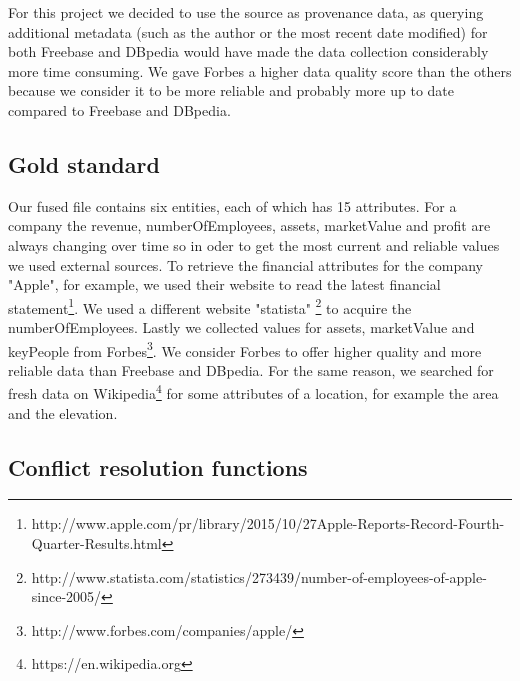 

For this project we decided to use the source as provenance data, as querying additional metadata (such as the author or the most recent date modified) for both Freebase and DBpedia would have made the data collection considerably more time consuming. We gave Forbes a higher data quality score than the others because we consider it to be more reliable and probably more up to date compared to Freebase and DBpedia.




\subsection{Gold standard}
Our fused file contains six entities, each of which has 15 attributes. For a company the revenue, numberOfEmployees, assets, marketValue and profit are always changing over time so in oder to get the most current and reliable values we used external sources. To retrieve the financial attributes for the company "Apple", for example, we used their website to read the latest financial statement\footnote{http://www.apple.com/pr/library/2015/10/27Apple-Reports-Record-Fourth-Quarter-Results.html}. We used a different website "statista" \footnote{http://www.statista.com/statistics/273439/number-of-employees-of-apple-since-2005/} to acquire the numberOfEmployees. Lastly we collected values for assets, marketValue and keyPeople from Forbes\footnote{http://www.forbes.com/companies/apple/}. We consider Forbes to offer higher quality and more reliable data than Freebase and DBpedia. For the same reason, we searched for fresh data on Wikipedia\footnote{https://en.wikipedia.org} for some attributes of a location, for example the area and the elevation. 

 

\subsection{Conflict resolution functions}

